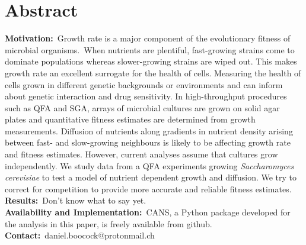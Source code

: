 \section*{Abstract}
\label{sec:abstract}

\textbf{Motivation:}~Growth rate is a major component of the
evolutionary fitness of microbial organisms.~When nutrients are
plentiful, fast-growing strains come to dominate populations whereas
slower-growing strains are wiped out. This makes growth rate an
excellent surrogate for the health of cells. Measuring the health of
cells grown in different genetic backgrounds or environments and can
inform about genetic interaction and drug sensitivity. In
high-throughput procedures such as QFA and SGA, arrays of microbial
cultures are grown on solid agar plates and quantitative fitness
estimates are determined from growth measurements. Diffusion of
nutrients along gradients in nutrient density arising between fast-
and slow-growing neighbours is likely to be affecting growth rate and
fitness estimates. However, current analyses assume that cultures grow
independently. We study data from a QFA experiments growing
\textit{Saccharomyces cerevisiae} to test a model of nutrient
dependent growth and diffusion. We try to correct for competition to
provide more accurate and reliable fitness estimates.
\\
\textbf{Results:}~Don't know what to say yet.\\
\textbf{Availability and Implementation:}~CANS, a Python package
developed for the analysis in this paper, is freely available from
github.
\\
\textbf{Contact:}~daniel.boocock@protonmail.ch\\


